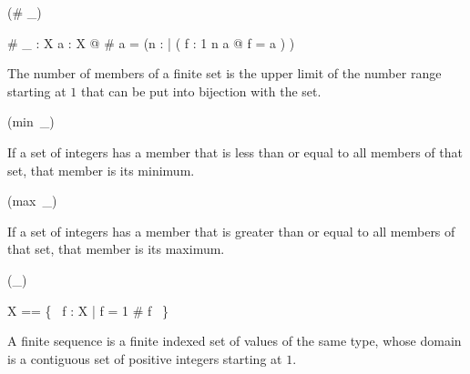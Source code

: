 \documentclass[draft,a4paper,10pt,wd]{isov2}
\begin{document}
\begin{zed}
\function (\# \_)
\end{zed}

\begin{gendef}[X]
\# \_ : \finset X \fun \nat
\where
\forall a : \finset X @ \# a = (\mu n : \nat | ( \exists f : 1 \upto n \inj a @ \ran f = a ) )
\end{gendef}

The number of members of a finite set is the upper limit of the number
range starting at $1$ that can be put into bijection with the set.


\begin{zed}
\function (min~\_)
\end{zed}


If a set of integers has a member that is less than or equal
to all members of that set,
that member is its minimum.


\begin{zed}
\function (max~\_)
\end{zed}


If a set of integers has a member that is greater than or equal
to all members of that set,
that member is its maximum.


\begin{zed}
\generic (\seq \_)
\end{zed}

\begin{zed}
\seq X == \{~ f : \nat \ffun X | \dom f = 1 \upto \# f ~\}
\end{zed}

A finite sequence is a finite indexed set of values of the same type,
whose domain is a contiguous set of positive integers starting at $1$.
\end{document}
